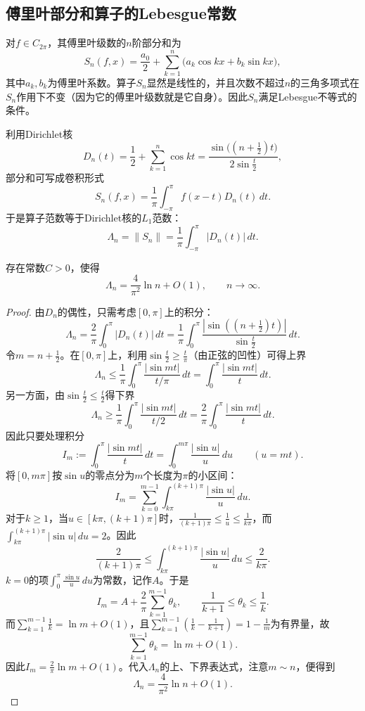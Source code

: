 \subsection{傅里叶部分和算子的Lebesgue常数}

对$f\in C_{2\pi}$，其傅里叶级数的$n$阶部分和为
\[
S_n(f,x)=\frac{a_0}{2}+\sum_{k=1}^{n}\bigl(a_k\cos kx+b_k\sin kx\bigr),
\]
其中$a_k,b_k$为傅里叶系数。算子$S_n$显然是线性的，并且次数不超过$n$的三角多项式在$S_n$作用下不变（因为它的傅里叶级数就是它自身）。因此$S_n$满足Lebesgue不等式的条件。

利用Dirichlet核
\[
D_n(t)=\frac12+\sum_{k=1}^{n}\cos kt=\frac{\sin\bigl((n+\frac12)t\bigr)}{2\sin\frac{t}{2}},
\]
部分和可写成卷积形式
\[
S_n(f,x)=\frac1\pi\int_{-\pi}^{\pi}f(x-t)D_n(t)\,dt.
\]
于是算子范数等于Dirichlet核的$L_1$范数：
\[
\Lambda_n=\|S_n\|=\frac1\pi\int_{-\pi}^{\pi}|D_n(t)|\,dt.
\]

\begin{theorem}[傅里叶部分和的Lebesgue常数的渐近阶]
存在常数$C>0$，使得
\[
\Lambda_n=\frac{4}{\pi^2}\ln n+O(1),\qquad n\to\infty.
\]
\end{theorem}

\begin{proof}
由$D_n$的偶性，只需考虑$[0,\pi]$上的积分：
\[
\Lambda_n=\frac2\pi\int_0^\pi|D_n(t)|\,dt
=\frac1\pi\int_0^\pi\frac{|\sin((n+\frac12)t)|}{\sin\frac{t}{2}}\,dt.
\]
令$m=n+\frac12$。在$[0,\pi]$上，利用$\sin\frac{t}{2}\ge\frac{t}{\pi}$（由正弦的凹性）可得上界
\[
\Lambda_n\le\frac1\pi\int_0^\pi\frac{|\sin mt|}{t/\pi}\,dt
=\int_0^\pi\frac{|\sin mt|}{t}\,dt.
\]
另一方面，由$\sin\frac{t}{2}\le\frac{t}{2}$得下界
\[
\Lambda_n\ge\frac1\pi\int_0^\pi\frac{|\sin mt|}{t/2}\,dt
=\frac2\pi\int_0^\pi\frac{|\sin mt|}{t}\,dt.
\]
因此只要处理积分
\[
I_m:=\int_0^\pi\frac{|\sin mt|}{t}\,dt
=\int_0^{m\pi}\frac{|\sin u|}{u}\,du\qquad(u=mt).
\]
将$[0,m\pi]$按$\sin u$的零点分为$m$个长度为$\pi$的小区间：
\[
I_m=\sum_{k=0}^{m-1}\int_{k\pi}^{(k+1)\pi}\frac{|\sin u|}{u}\,du.
\]
对于$k\ge1$，当$u\in[k\pi,(k+1)\pi]$时，$\frac1{(k+1)\pi}\le\frac1u\le\frac1{k\pi}$，而$\int_{k\pi}^{(k+1)\pi}|\sin u|\,du=2$。因此
\[
\frac{2}{(k+1)\pi}\le\int_{k\pi}^{(k+1)\pi}\frac{|\sin u|}{u}\,du\le\frac{2}{k\pi}.
\]
$k=0$的项$\int_0^\pi\frac{\sin u}{u}\,du$为常数，记作$A$。于是
\[
I_m=A+\frac{2}{\pi}\sum_{k=1}^{m-1}\theta_k,\qquad \frac{1}{k+1}\le\theta_k\le\frac1k.
\]
而$\sum_{k=1}^{m-1}\frac1k=\ln m+O(1)$，且$\sum_{k=1}^{m-1}(\frac1k-\frac1{k+1})=1-\frac1m$为有界量，故
\[
\sum_{k=1}^{m-1}\theta_k=\ln m+O(1).
\]
因此$I_m=\frac{2}{\pi}\ln m+O(1)$。代入$\Lambda_n$的上、下界表达式，注意$m\sim n$，便得到
\[
\Lambda_n=\frac{4}{\pi^2}\ln n+O(1).
\]
\end{proof}

